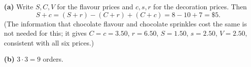 \textbf{(a)} Write $S,C,V$ for the flavour prices and $c,s,r$ for the decoration prices. Then
\[S+c=(S+r)-(C+r)+(C+c)=8-10+7=\boxed{\$5}.\]
(The information that chocolate flavour and chocolate sprinkles cost the same is not needed for this; it gives $C=c=3.50$, $r=6.50$, $S=1.50$, $s=2.50$, $V=2.50$, consistent with all six prices.)

\textbf{(b)} $3\cdot3=\boxed{9}$ orders.

